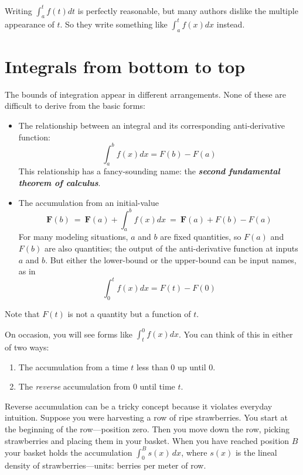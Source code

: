 \documentclass[
  letterpaper,
  DIV=11,
  numbers=noendperiod,
  oneside]{scrreprt}
\providecommand{\tightlist}{%
  \setlength{\itemsep}{0pt}\setlength{\parskip}{0pt}}
\begin{document}
Writing \(\int_a^t f(t) dt\) is perfectly reasonable, but many authors
dislike the multiple appearance of \(t\). So they write something like
\(\int_a^t f(x) dx\) instead.

\hypertarget{integrals-from-bottom-to-top}{%
\section{Integrals from bottom to
top}\label{integrals-from-bottom-to-top}}

The bounds of integration appear in different arrangements. None of
these are difficult to derive from the basic forms:

\begin{itemize}
\tightlist
\item
  The relationship between an integral and its corresponding
  anti-derivative function: \[\int_a^b f(x) dx = F(b) - F(a)\] This
  relationship has a fancy-sounding name: the \textbf{\emph{second
  fundamental theorem of calculus}}.
\item
  The accumulation from an initial-value
  \[{\mathbf F}(b)\  =\  {\mathbf F}(a) + \int_a^b f(x) dx\  = \ {\mathbf F}(a) + F(b) - F(a)\]
  For many modeling situations, \(a\) and \(b\) are fixed quantities, so
  \(F(a)\) and \(F(b)\) are also quantities; the output of the
  anti-derivative function at inputs \(a\) and \(b\). But either the
  lower-bound or the upper-bound can be input names, as in
  \[\int_0^t f(x) dx = F(t) - F(0)\]
\end{itemize}

Note that \(F(t)\) is not a quantity but a function of \(t\).

On occasion, you will see forms like \(\int_t^0 f(x)dx\). You can think
of this in either of two ways:

\begin{enumerate}
\def\labelenumi{\arabic{enumi}.}
\tightlist
\item
  The accumulation from a time \(t\) less than 0 up until 0.
\item
  The \emph{reverse} accumulation from 0 until time \(t\).
\end{enumerate}

Reverse accumulation can be a tricky concept because it violates
everyday intuition. Suppose you were harvesting a row of ripe
strawberries. You start at the beginning of the row---position zero.
Then you move down the row, picking strawberries and placing them in
your basket. When you have reached position \(B\) your basket holds the
accumulation \(\int_0^B s(x)\, dx\), where \(s(x)\) is the lineal
density of strawberries---units: berries per meter of row.
\end{document}
